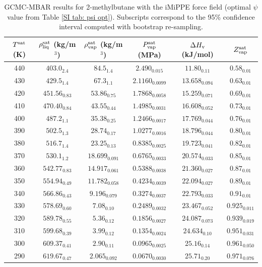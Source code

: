 \documentclass[journal=jctc,manuscript=article]{achemso}
\begin{document}
\begin{table}[htb!]
	\caption{GCMC-MBAR results for 2-methylbutane with the iMiPPE force field (optimal $\psi$ value from Table \ref{SI tab: psi opt}). Subscripts correspond to the 95\% confidence interval computed with bootstrap re-sampling.}
	\begin{center}
		\begin{tabular}{|c|c|c|c|c|c|}
			\hline
			$T^{\rm sat}$ (K) & $\rho_{\rm liq}^{\rm sat}$ (kg/m$^3$) & $\rho_{\rm vap}^{\rm sat}$ (kg/m$^3$) & $P_{\rm vap}^{\rm sat}$ (MPa) & $\Delta H_{\rm v}$ (kJ/mol) & $Z_{\rm vap}^{\rm sat}$ \\ \hline
			440 & $403.0_{2.4}$ & $84.5_{1.4}$ & $2.490_{0.015}$ & $11.80_{0.11}$ & $0.58_{0.01}$ \\
			430 & $429.5_{1.4}$ & $67.3_{1.1}$ & $2.1160_{0.0099}$ & $13.658_{0.094}$ & $0.63_{0.01}$ \\
			420 & $451.56_{0.83}$ & $53.86_{0.75}$ & $1.7868_{0.0058}$ & $15.259_{0.071}$ & $0.69_{0.01}$ \\
			410 & $470.40_{0.84}$ & $43.55_{0.44}$ & $1.4985_{0.0031}$ & $16.608_{0.052}$ & $0.73_{0.01}$ \\
			400 & $487.2_{1.1}$ & $35.38_{0.25}$ & $1.2466_{0.0017}$ & $17.769_{0.044}$ & $0.76_{0.01}$ \\
			390 & $502.5_{1.3}$ & $28.74_{0.17}$ & $1.0277_{0.0016}$ & $18.796_{0.044}$ & $0.80_{0.01}$ \\
			380 & $516.7_{1.4}$ & $23.25_{0.13}$ & $0.8385_{0.0025}$ & $19.723_{0.041}$ & $0.82_{0.01}$ \\
			370 & $530.1_{1.2}$ & $18.699_{0.091}$ & $0.6765_{0.0033}$ & $20.574_{0.033}$ & $0.85_{0.01}$ \\
			360 & $542.77_{0.83}$ & $14.917_{0.061}$ & $0.5388_{0.0038}$ & $21.360_{0.027}$ & $0.87_{0.01}$ \\
			350 & $554.94_{0.49}$ & $11.782_{0.058}$ & $0.4234_{0.0039}$ & $22.094_{0.027}$ & $0.89_{0.01}$ \\
			340 & $566.86_{0.43}$ & $9.196_{0.079}$ & $0.3274_{0.0037}$ & $22.793_{0.033}$ & $0.91_{0.01}$ \\
			330 & $578.69_{0.60}$ & $7.08_{0.10}$ & $0.2489_{0.0032}$ & $23.467_{0.052}$ & $0.925_{0.011}$ \\
			320 & $589.78_{0.55}$ & $5.36_{0.12}$ & $0.1856_{0.0027}$ & $24.087_{0.073}$ & $0.939_{0.019}$ \\
			310 & $599.68_{0.39}$ & $3.99_{0.12}$ & $0.1354_{0.0024}$ & $24.634_{0.10}$ & $0.951_{0.031}$ \\
			300 & $609.37_{0.41}$ & $2.90_{0.11}$ & $0.0965_{0.0025}$ & $25.16_{0.14}$ & $0.961_{0.050}$ \\
			290 & $619.67_{0.47}$ & $2.065_{0.092}$ & $0.0670_{0.0030}$ & $25.71_{0.20}$ & $0.971_{0.076}$ \\
			\hline
		\end{tabular}
	\end{center}
\end{table}
\end{document}
